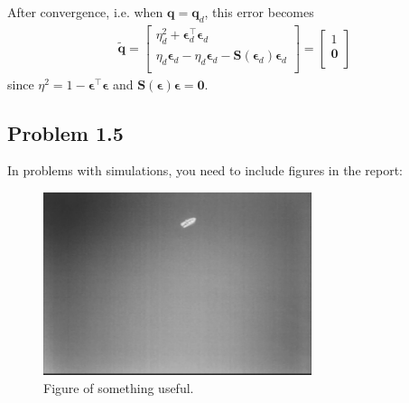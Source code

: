 After convergence, i.e. when $\mathbf{q} = \mathbf{q}_d$, this error becomes
\begin{equation}\begin{aligned}
\tilde{\mathbf{q}} =
\begin{bmatrix}
\eta_d^2 + \boldsymbol{\epsilon}^\top_d \boldsymbol{\epsilon}_d\\
\eta_d \boldsymbol{\epsilon}_d - \eta_d \boldsymbol{\epsilon}_d - \mathbf{S}(\boldsymbol{\epsilon}_d)\boldsymbol{\epsilon}_d\\
\end{bmatrix}
=
\begin{bmatrix}
1\\
\mathbf{0}\\
\end{bmatrix}
\end{aligned}\end{equation}
since $\eta^2 = 1 - \boldsymbol{\epsilon}^\top \boldsymbol{\epsilon}$ and $\boldsymbol{\mathbf{S}}(\boldsymbol{\epsilon})\boldsymbol{\epsilon} = \mathbf{0}$.

\subsection{Problem 1.5}
In problems with simulations, you need to include figures in the report:
\begin{figure}[ht]
	\centering
	\includegraphics[width=0.7\textwidth]{fig1} %
	\caption{Figure of something useful.}
	\label{fig:fig1}
\end{figure}

